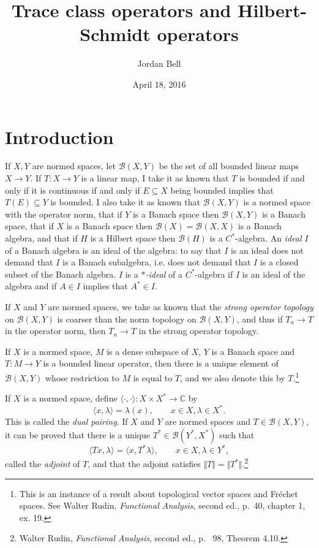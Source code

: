 \documentclass{article}
\newcommand{\inner}[2]{\langle #1, #2 \rangle}
\newcommand{\norm}[1]{\Vert #1 \Vert}
\begin{document}
\title{Trace class operators and Hilbert-Schmidt operators}
\author{Jordan Bell}
\date{April 18, 2016}

\maketitle

\section{Introduction}
If $X,Y$ are normed spaces, let $\mathscr{B}(X,Y)$ be the set of all bounded linear maps $X \to Y$. If $T:X \to Y$ is a linear map,
I take it as known that $T$ is bounded if and only if it is continuous if and only if $E \subseteq X$ being bounded implies that $T(E) \subseteq Y$ is bounded.
I also take it as known that $\mathscr{B}(X,Y)$ is a normed space with the operator norm,
 that if $Y$ is a Banach space then $\mathscr{B}(X,Y)$ is a Banach space,  that if $X$ is a Banach space then $\mathscr{B}(X)=\mathscr{B}(X,X)$ is a Banach algebra, and that if $H$ is a Hilbert space then $\mathscr{B}(H)$ is a 
 $C^*$-algebra. An {\em ideal} $I$ of a Banach algebra is an ideal of the algebra: to say that $I$ is an ideal does not demand that $I$ is  a Banach subalgebra, i.e. does not demand
 that $I$ is a closed subset of the Banach algebra. $I$ is a  {\em $*$-ideal} of a $C^*$-algebra if $I$ is an ideal of the algebra and if $A \in I$ implies that $A^* \in I$.

If $X$ and $Y$ are normed spaces, we take as known that the {\em strong operator topology} on $\mathscr{B}(X,Y)$ is coarser than the norm topology on $\mathscr{B}(X,Y)$, and thus if $T_n \to T$
in the operator norm, then $T_n \to T$ in the strong operator topology.

If $X$ is a normed space, $M$ is a dense subspace of $X$, $Y$ is a Banach space and $T:M \to Y$ is a bounded linear operator, then there is a unique element of $\mathscr{B}(X,Y)$
whose restriction to $M$ is equal to $T$, and we also denote this  by $T$.\footnote{This is an instance of a result about topological vector spaces and
Fr\'echet spaces. See Walter Rudin, {\em Functional Analysis}, second ed., p.~40, chapter 1, ex. 19.} 

If $X$ is a normed space, define $\inner{\cdot}{\cdot}:X \times X^* \to \mathbb{C}$ by 
\[
\inner{x}{\lambda}=\lambda(x), \qquad x \in X, \lambda \in X^*.
\]
This is called the {\em dual pairing}. If $X$ and $Y$ are normed spaces and $T \in \mathscr{B}(X,Y)$, it can be proved that there is a unique $T^* \in \mathscr{B}(Y^*,X^*)$ such that
\[
\inner{Tx}{\lambda}=\inner{x}{T^*\lambda}, \qquad x \in X, \lambda \in Y^*,
\]
called the {\em adjoint} of $T$, and that the adjoint satisfies $\norm{T}=\norm{T^*}$.\footnote{Walter Rudin,
{\em Functional Analysis}, second ed., p.~ 98, Theorem 4.10.}
\end{document}
